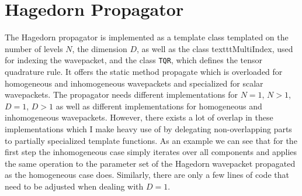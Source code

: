 \section{Hagedorn Propagator}
The Hagedorn propagator is implemented as a template class templated on the number of levels $N$, the dimension $D$, as well as the class texttt{MultiIndex}, used for indexing the wavepacket, and the class \texttt{TQR}, which defines the tensor quadrature rule.
It offers the static method propagate which is overloaded for homogeneous and inhomogeneous wavepackets and specialized for scalar wavepackets. 
The propagator needs different implementations for $N=1$, $N>1$, $D=1$, $D>1$ as well as different implementations for homogeneous and inhomogeneous wavepackets. However, there exists a lot of overlap in these implementations which I make heavy use of by delegating non-overlapping parts to partially specialized template functions. As an example we can see that for the first step the inhomogeneous case simply iterates over all components and applies the same operation to the parameter set of the Hagedorn wavepacket propagated as the homogeneous case does. Similarly, there are only a few lines of code that need to be adjusted when dealing with $D=1$.

